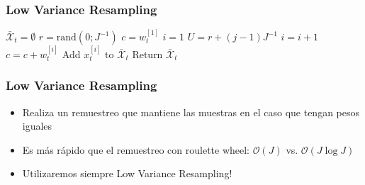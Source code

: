 \begin{frame}
    \frametitle{Low Variance Resampling}

    \begin{algorithmic}[1]
        \State $\bar{\mathcal{X}}_t = \emptyset$
        \State $r = \text{rand}(0; J^{-1})$
        \State $c = w_t^{[1]}$
        \State $i = 1$
            \State $U = r + (j - 1)  J^{-1}$
                \State $i = i + 1$
                \State $c = c + w_t^{[i]}$
            \EndWhile
            \State Add $x_t^{[i]}$ to $\bar{\mathcal{X}}_t$
        \EndFor
        \State Return $\bar{\mathcal{X}}_t$
        \EndProcedure
    \end{algorithmic}


\end{frame}

\begin{frame}
    \frametitle{Low Variance Resampling}

    \begin{itemize}
        \item Realiza un remuestreo que mantiene las muestras en el caso que tengan pesos iguales
        \item Es más rápido que el remuestreo con roulette wheel: $\mathcal{O}(J)$ vs. $\mathcal{O}(J \log J)$
        \item \alert{Utilizaremos siempre Low Variance Resampling!}
    \end{itemize}
\end{frame}


